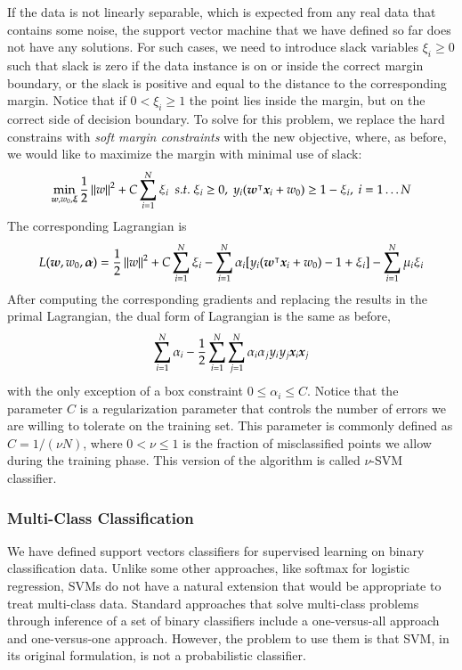 \begin{refsection}
If the data is not linearly separable, which is expected from any real data that contains some noise, the support vector machine that we have defined so far does not have any solutions. For such cases, we need to introduce slack variables $\xi_i\geq 0$ such that slack is zero if the data instance is on or inside the correct margin boundary, or the slack is positive and equal to the distance to the corresponding margin. Notice that if $0<\xi_i\geq 1$ the point lies inside the margin, but on the correct side of decision boundary. To solve for this problem, we replace the hard constrains with {\em soft margin constraints} with the new objective, where, as before, we would like to maximize the margin with minimal use of slack:
$$ \min_{\vect{w},w_0,\vect{\xi}} {1\over 2}\norm{w}^2+C\sum_{i=1}^N\xi_i\ \ s.t.\ \xi_i\geq 0,\ y_i(\vect{w}^\tr \vect{x}_i+w_0)\geq 1-\xi_i,\ i=1\ldots N$$
The corresponding Lagrangian is
$$ L(\boldsymbol{w},w_0,\boldsymbol{\alpha})={1\over 2}\left\lVert w\right\rVert^2 + C\sum_{i=1}^N\xi_i - \sum_{i=1}^N \alpha_i [y_i(\boldsymbol{w}^\intercal \boldsymbol{x}_i+w_0)-1+\xi_i] -\sum_{i=1}^N\mu_i\xi_i$$
After computing the corresponding gradients and replacing the results in the primal Lagrangian, the dual form of Lagrangian is the same as before,
$$ \sum_{i=1}^N \alpha_i - {1\over 2}\sum_{i=1}^N\sum_{j=1}^N \alpha_i\alpha_j y_i y_j \boldsymbol{x}_i\boldsymbol{x}_j $$
with the only exception of a box constraint $0\leq\alpha_i\leq C$. Notice that the parameter $C$ is a regularization parameter that controls the number of errors we are willing to tolerate on the training set. This parameter is commonly defined as $C=1/(\nu N)$, where $0<\nu\leq 1$ is the fraction of misclassified points we allow during the training phase. This version of the algorithm is called $\nu$-SVM classifier.

\subsubsection*{Multi-Class Classification}

We have defined support vectors classifiers for supervised learning on binary classification data. Unlike some other approaches, like softmax for logistic regression, SVMs do not have a natural extension that would be appropriate to treat multi-class data. Standard approaches that solve multi-class problems through inference of a set of binary classifiers include a one-versus-all approach and one-versus-one approach. However, the problem to use them is that SVM, in its original formulation, is not a probabilistic classifier.


\end{refsection}
